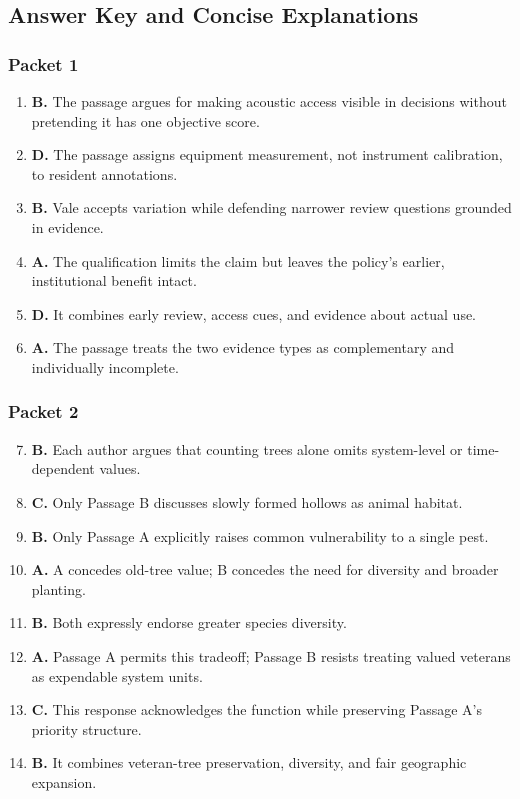 \subsection*{Answer Key and Concise Explanations}

\subsubsection*{Packet 1}
\begin{enumerate}
\item \textbf{B.} The passage argues for making acoustic access visible in decisions without pretending it has one objective score.
\item \textbf{D.} The passage assigns equipment measurement, not instrument calibration, to resident annotations.
\item \textbf{B.} Vale accepts variation while defending narrower review questions grounded in evidence.
\item \textbf{A.} The qualification limits the claim but leaves the policy's earlier, institutional benefit intact.
\item \textbf{D.} It combines early review, access cues, and evidence about actual use.
\item \textbf{A.} The passage treats the two evidence types as complementary and individually incomplete.
\end{enumerate}

\subsubsection*{Packet 2}
\begin{enumerate}
\setcounter{enumi}{6}
\item \textbf{B.} Each author argues that counting trees alone omits system-level or time-dependent values.
\item \textbf{C.} Only Passage B discusses slowly formed hollows as animal habitat.
\item \textbf{B.} Only Passage A explicitly raises common vulnerability to a single pest.
\item \textbf{A.} A concedes old-tree value; B concedes the need for diversity and broader planting.
\item \textbf{B.} Both expressly endorse greater species diversity.
\item \textbf{A.} Passage A permits this tradeoff; Passage B resists treating valued veterans as expendable system units.
\item \textbf{C.} This response acknowledges the function while preserving Passage A's priority structure.
\item \textbf{B.} It combines veteran-tree preservation, diversity, and fair geographic expansion.
\end{enumerate}

